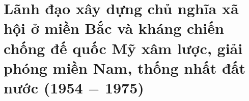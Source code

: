 

\section{Lãnh đạo xây dựng chủ nghĩa xã hội ở miền Bắc và kháng chiến chống đế quốc Mỹ xâm lược, giải phóng miền Nam, thống nhất đất nước (1954 $-$ 1975)}


